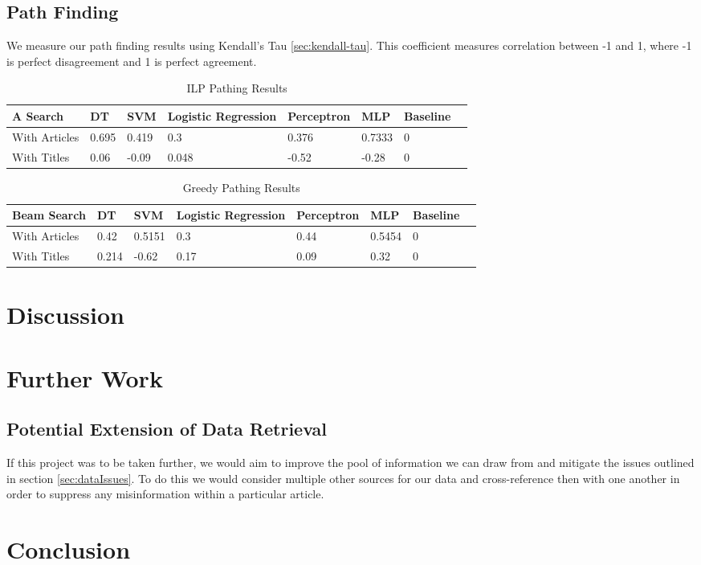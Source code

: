 \documentclass[bsc,frontabs,twoside,singlespacing,parskip,deptreport]{infthesis}     %
\begin{document}
\subsection{Path Finding}
We measure our path finding results using Kendall's Tau \ref{sec:kendall-tau}. This coefficient
measures correlation between -1 and 1, where -1 is perfect disagreement and 1 is perfect agreement.



\begin{table}[H]
\centering
\label{table:ILP-results}
\begin{tabular}{|l|l|l|l|l|l|l|l|}
  \hline
  A\* Search & DT & SVM &Logistic Regression & Perceptron & MLP & Baseline\\
  \hline
With Articles & 0.695 & 0.419 & 0.3 & 0.376   & 0.7333  & 0\\
\hline
With Titles &0.06  & -0.09 & 0.048 & -0.52  & -0.28 & 0\\
\hline
\end{tabular}
\caption{ILP Pathing Results}
\end{table}



\begin{table}[H]
\centering
\label{table:greedy-results}
\begin{tabular}{|l|l|l|l|l|l|l|l|}
  \hline
  Beam Search & DT & SVM &Logistic Regression & Perceptron & MLP & Baseline\\
  \hline
With Articles & 0.42 & 0.5151 & 0.3 &  0.44  & 0.5454  & 0\\
\hline
With Titles & 0.214 & -0.62 & 0.17 & 0.09  & 0.32 & 0\\
\hline
\end{tabular}
\caption{Greedy Pathing Results}
\end{table}

\section{Discussion}
\section{Further Work}
\subsection{Potential Extension of Data Retrieval}
If this project was to be taken further, we would aim to improve the pool of information we can draw from and mitigate the issues outlined in section \ref{sec:dataIssues}.
To do this we would consider multiple other sources for our data and cross-reference then with one another in order to suppress any misinformation within
a particular article.


\section{Conclusion}


\end{document}
